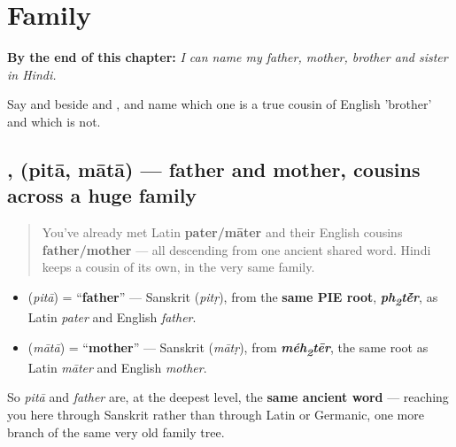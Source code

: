 
\chapter{Family}
\label{ch:hi-family}

\begin{chapteropening}
\textbf{By the end of this chapter:} \emph{I can name my father, mother, brother and sister in Hindi.}

Say  and  beside  and , and name which one is a true cousin of English 'brother' and which is not.
\end{chapteropening}

\section[\texorpdfstring{\hi{पिता} / \hi{माता} … (pitā / mātā …)}{पिता / माता … (pitā / mātā …)}]{,  (pitā, mātā) — father and mother, cousins across a huge family}

\label{lesson:HI-C12-pitaa-maataa}



\begin{quote}
You've already met Latin \textbf{pater/māter} and their English cousins \textbf{father/mother} — all descending from one ancient shared word. Hindi keeps a cousin of its own, in the very same family.
\end{quote}

\begin{cousinweb}
\begin{itemize}
\raggedright
  \item \textbf{} (\emph{pitā}) = \textquotedblleft{}\textbf{father}\textquotedblright{} — Sanskrit \textbf{} (\emph{pitṛ}), from the \textbf{same PIE root}, \emph{\textbf{ph\textsubscript{2}t\'{\={e}}r}}, as Latin \emph{pater} and English \emph{father}.
  \item \textbf{} (\emph{mātā}) = \textquotedblleft{}\textbf{mother}\textquotedblright{} — Sanskrit \textbf{} (\emph{mātṛ}), from \emph{\textbf{méh\textsubscript{2}tēr}}, the same root as Latin \emph{māter} and English \emph{mother}.
\end{itemize}

So \emph{pitā} and \emph{father} are, at the deepest level, the \textbf{same ancient word} — reaching you here through Sanskrit rather than through Latin or Germanic, one more branch of the same very old family tree.
\end{cousinweb}

